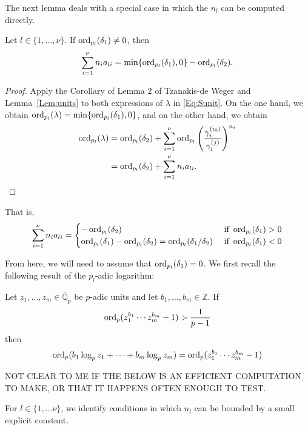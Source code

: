 The next lemma deals with a special case in which the $n_l$ can be computed directly. 

\begin{lemma}
Let $l \in \{1, \dots, \nu \}$. If $\operatorname{ord}_{p_l}(\delta_1) \neq 0$, then 
\[ \sum_{i = 1}^{\nu} n_ia_{li} = \min\{\operatorname{ord}_{p_l}(\delta_1), 0\} - \operatorname{ord}_{p_l}(\delta_2).\]
\end{lemma}


\begin{proof}
Apply the Corollary of Lemma $2$ of Tzanakis-de Weger and Lemma~\ref{Lem:units} to both expressions of $\lambda$ in \eqref{Eq:Sunit}. On the one hand, we obtain $\operatorname{ord}_{p_l}(\lambda) = \min\{\operatorname{ord}_{p_l}(\delta_1), 0\}$, and on the other hand, we obtain 
\[\begin{split}
\operatorname{ord}_{p_l}(\lambda)
& = \operatorname{ord}_{p_l}(\delta_2) + \sum_{i = 1}^{\nu} \operatorname{ord}_{p_l}\left( \frac{\gamma_i^{(i_0)}}{\gamma_i^{(j)}}\right)^{n_i}\\
& = \operatorname{ord}_{p_l}(\delta_2) + \sum_{i = 1}^{\nu} n_ia_{li}.
\end{split}\]
\end{proof}

That is, 
\[\sum_{i = 1}^{\nu} n_ia_{li} = \begin{cases}
- \operatorname{ord}_{p_l}(\delta_2) & \text{ if } \operatorname{ord}_{p_l}(\delta_1) > 0 \\
 \operatorname{ord}_{p_l}(\delta_1)- \operatorname{ord}_{p_l}(\delta_2) = \operatorname{ord}_{p_l}(\delta_1/\delta_2) & \text{ if } \operatorname{ord}_{p_l}(\delta_1) < 0 \\
\end{cases}\]


From here, we will need to assume that $\operatorname{ord}_{p_l}(\delta_1) = 0$. We first recall the following result of the $p_l$-adic logarithm:

\begin{lemma}\label{Lem:padic}
Let $z_1, \dots, z_m \in \overline{\mathbb{Q}}_p$ be $p$-adic units and let $b_1, \dots, b_m \in \mathbb{Z}$. If
\[\operatorname{ord}_p(z_1^{b_1}\cdots z_m^{b_m} - 1) > \frac{1}{p-1}\]
then
\[\operatorname{ord}_p(b_1\log_p z_1 + \cdots + b_m \log_p z_m) = \operatorname{ord}_p(z_1^{b_1}\cdots z_m^{b_m} - 1) \]
\end{lemma}

NOT CLEAR TO ME IF THE BELOW IS AN EFFICIENT COMPUTATION TO MAKE, OR THAT IT HAPPENS OFTEN ENOUGH TO TEST.

For $l \in \{1, \dots \nu\}$, we identify conditions in which $n_l$ can be bounded by a small explicit constant.

